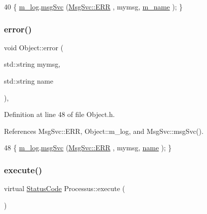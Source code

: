 \begin{DoxyCode}
40 \{ \hyperlink{classObject_a0d269813dd7ac1f24bc143031e2963f2}{m\_log}.\hyperlink{classMsgSvc_ad25f18047920cc59a314e5098259711c}{msgSvc} (\hyperlink{classMsgSvc_ae671eb7301996cd049d2da8a65925926a35a9d7166e9896af4ec8fb33bf5f1772}{MsgSvc::ERR}     , mymsg, \hyperlink{classObject_a8b83c95c705d2c3ba0d081fe1710f48d}{m\_name} ); \}
\end{DoxyCode}
\mbox{\label{classObject_ad7f6c457733082efa2f9ff5f5c8e119a}} 
\subsubsection{\texorpdfstring{error()}{error()}\hspace{0.1cm}{\footnotesize\ttfamily [2/2]}}
{\footnotesize\ttfamily void Object\+::error (\begin{DoxyParamCaption}\item[{std\+::string}]{mymsg,  }\item[{std\+::string}]{name }\end{DoxyParamCaption})\hspace{0.3cm}{\ttfamily [inline]}, {\ttfamily [inherited]}}



Definition at line 48 of file Object.\+h.



References Msg\+Svc\+::\+E\+RR, Object\+::m\+\_\+log, and Msg\+Svc\+::msg\+Svc().


\begin{DoxyCode}
48 \{ \hyperlink{classObject_a0d269813dd7ac1f24bc143031e2963f2}{m\_log}.\hyperlink{classMsgSvc_ad25f18047920cc59a314e5098259711c}{msgSvc} (\hyperlink{classMsgSvc_ae671eb7301996cd049d2da8a65925926a35a9d7166e9896af4ec8fb33bf5f1772}{MsgSvc::ERR}     , mymsg, \hyperlink{classObject_a300f4c05dd468c7bb8b3c968868443c1}{name} ); \}
\end{DoxyCode}
\mbox{\label{classProcessus_a63767a63a1fb0055c5aa45b21a4a5d58}} 
\subsubsection{\texorpdfstring{execute()}{execute()}}
{\footnotesize\ttfamily virtual \hyperlink{classStatusCode}{Status\+Code} Processus\+::execute (\begin{DoxyParamCaption}{ }\end{DoxyParamCaption})\hspace{0.3cm}{\ttfamily [pure virtual]}}

